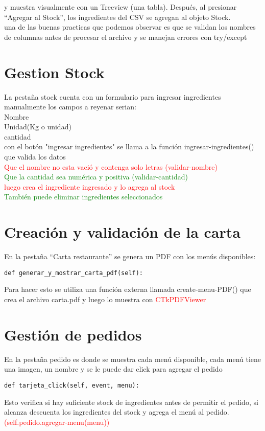 \documentclass{article}
\begin{document}
y muestra visualmente con un Treeview (una tabla).
Después, al presionar “Agregar al Stock”, los ingredientes del CSV se agregan al objeto Stock.\\

una de las buenas practicas que podemos observar es que se validan los nombres de columnas antes de procesar el archivo y se manejan errores con try/except

\section{Gestion Stock}
La pestaña stock cuenta con un formulario para ingresar ingredientes manualmente los campos a reyenar serian:\\
Nombre\\
Unidad(Kg o unidad)\\
cantidad\\
con el botón "ingresar ingredientes" se llama a la función ingresar-ingredientes() que valida los datos\\
\textcolor{red}{Que el nombre no esta vació y contenga solo letras (validar-nombre)}\\
\textcolor{green}{Que la cantidad sea numérica y positiva (validar-cantidad)}\\
\textcolor{red}{luego crea el ingrediente ingresado y lo agrega al stock}\\
\textcolor{green}{También puede eliminar ingredientes  seleccionados}\\
\section{Creación y validación de la carta}
En la pestaña “Carta restaurante” se genera un PDF con los menús disponibles:\\
\begin{verbatim}
def generar_y_mostrar_carta_pdf(self):
\end{verbatim}
Para hacer esto se utiliza una función externa llamada create-menu-PDF() que crea el archivo carta.pdf y luego lo muestra con \textcolor{red}{CTkPDFViewer}\\
\section{Gestión de pedidos}
En la pestaña pedido es donde se muestra cada menú disponible, cada menú tiene una imagen, un nombre y se le puede dar click para agregar el pedido\\
\begin{verbatim}
def tarjeta_click(self, event, menu):
\end{verbatim}
Esto verifica si hay suficiente stock de ingredientes antes de permitir el pedido, si alcanza descuenta los ingredientes del stock y agrega el menú al pedido.\textcolor{red}{(self.pedido.agregar-menu(menu))}\\
\end{document}
